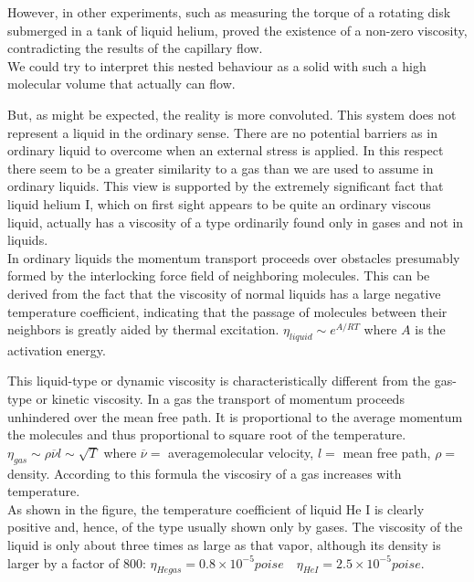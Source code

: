 \documentclass{article}
\begin{document}
However, in other experiments, such as measuring the torque of a rotating disk submerged in a tank of liquid helium, proved the existence of a non-zero viscosity, contradicting the results of the capillary flow.
\\

We could try to interpret this nested behaviour as a solid with such a high molecular volume that actually can flow.

But, as might be expected, the reality is more convoluted. This system does not represent a liquid in the ordinary sense. There are no potential barriers as in ordinary liquid to overcome when an external stress is applied. In this respect there seem to be a greater similarity to a gas than we are used to assume in ordinary liquids. This view is supported by the extremely significant fact that liquid helium I, which on first sight appears to be quite an ordinary viscous liquid, actually has a viscosity of a type ordinarily found only in gases and not in liquids.
\\

In ordinary liquids the momentum transport proceeds over obstacles presumably formed by the interlocking force field of neighboring molecules. This can be derived from the fact that the viscosity of normal liquids has a large negative temperature coefficient, indicating that the passage of molecules between their neighbors is greatly aided by thermal excitation. $\eta_{liquid}\sim e^{A/RT}$ where $A$ is the activation energy.

This liquid-type or dynamic viscosity is characteristically different from the gas-type or kinetic viscosity. In a gas the transport of momentum proceeds unhindered over the mean free path. It is proportional to the average momentum the molecules and thus proportional to square root of the temperature. $\eta_{gas} \sim \rho \overline{\nu} l \sim \sqrt{T}$ where $\overline{\nu} =$ averagemolecular velocity, $l=$ mean free path, $\rho=$ density. According to this formula the viscosiry of a gas increases with temperature.
\\

As shown in the figure, the temperature coefficient of liquid He I is clearly positive and, hence, of the type usually shown only by gases. The viscosity of the liquid is only about three times as large as that vapor, although its density is larger by a factor of 800: $\eta_{He gas} = 0.8\times 10^{-5} poise \quad \eta_{He I} = 2.5\times 10^{-5} poise$.
\\
\end{document}
